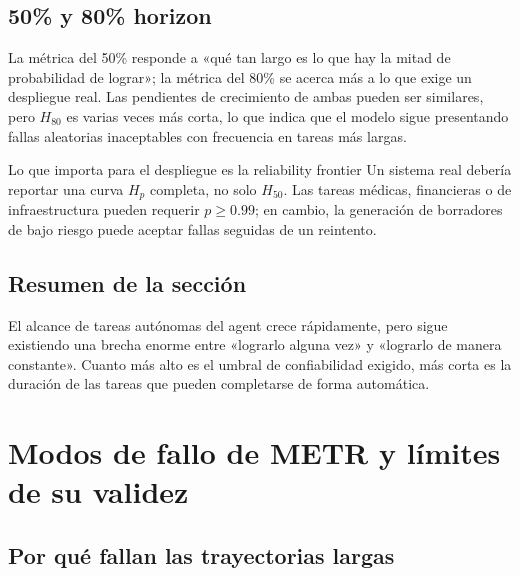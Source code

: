 \documentclass[a4paper]{article}
\begin{document}
\subsection{50\% y 80\% horizon}



La métrica del 50\% responde a «qué tan largo es lo que hay la mitad de probabilidad de lograr»; la métrica del 80\% se acerca más a lo que exige un despliegue real. Las pendientes de crecimiento de ambas pueden ser similares, pero $H_{80}$ es varias veces más corta, lo que indica que el modelo sigue presentando fallas aleatorias inaceptables con frecuencia en tareas más largas.

\begin{importantbox}{Lo que importa para el despliegue es la reliability frontier}
Un sistema real debería reportar una curva $H_p$ completa, no solo $H_{50}$. Las tareas médicas, financieras o de infraestructura pueden requerir $p\ge 0.99$; en cambio, la generación de borradores de bajo riesgo puede aceptar fallas seguidas de un reintento.
\end{importantbox}

\subsection{Resumen de la sección}

El alcance de tareas autónomas del agent crece rápidamente, pero sigue existiendo una brecha enorme entre «lograrlo alguna vez» y «lograrlo de manera constante». Cuanto más alto es el umbral de confiabilidad exigido, más corta es la duración de las tareas que pueden completarse de forma automática.

\section{Modos de fallo de METR y límites de su validez}

\subsection{Por qué fallan las trayectorias largas}
\end{document}
